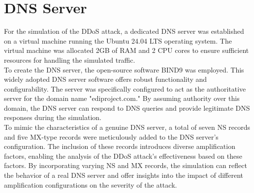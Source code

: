 \section{DNS Server}
For the simulation of the DDoS attack, a dedicated DNS server was established on a virtual machine running the Ubuntu 24.04 LTS operating system.
The virtual machine was allocated 2GB of RAM and 2 CPU cores to ensure sufficient resources for handling the simulated traffic.\\
To create the DNS server, the open-source software BIND9 was employed. This widely adopted DNS server software offers robust functionality and configurability.
The server was specifically configured to act as the authoritative server for the domain name "ediproject.com."
By assuming authority over this domain, the DNS server can respond to DNS queries and provide legitimate DNS responses during the simulation.\\
To mimic the characteristics of a genuine DNS server, a total of seven NS records and five MX-type records were meticulously added to the DNS server's configuration.
The inclusion of these records introduces diverse amplification factors, enabling the analysis of the DDoS attack's effectiveness based on these factors.
By incorporating varying NS and MX records, the simulation can reflect the behavior of a real DNS server and offer insights into the impact of
different amplification configurations on the severity of the attack.\\
